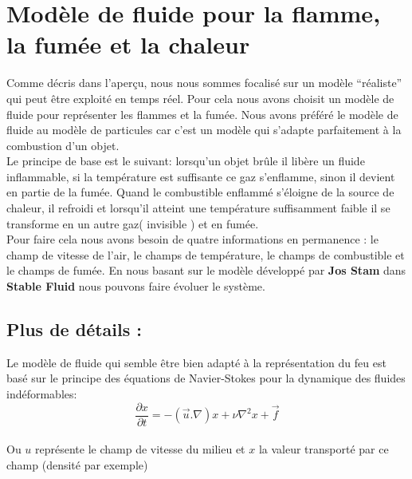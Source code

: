 \documentclass[a4paper,10pt]{article}
\begin{document}
\section{Modèle de fluide pour la flamme, la fumée et la chaleur}
Comme décris dans l'aperçu, nous nous sommes focalisé sur un modèle
``réaliste'' qui peut être exploité en temps réel. Pour cela nous
avons choisit un modèle de fluide pour représenter les flammes et la fumée. 
Nous avons préféré le modèle de fluide au modèle de particules
car c'est un modèle qui s'adapte parfaitement à la combustion d'un objet.\\

Le principe de base est le suivant: lorsqu'un objet brûle il libère un
fluide inflammable, si la température est suffisante ce gaz
s'enflamme, sinon il devient en partie de la fumée. Quand le
combustible enflammé s'éloigne de la source de chaleur, il refroidi et
lorsqu'il atteint une température suffisamment faible il se transforme
en un autre gaz( invisible ) et en fumée.\\

Pour faire cela nous avons besoin de quatre informations en permanence
: le champ de vitesse de l'air, le champs de température, le champs de combustible
 et le champs de fumée. En nous basant sur le modèle développé par \textbf{Jos Stam} 
 dans \textbf{Stable Fluid} nous pouvons faire évoluer le système.\\


\subsection{Plus de détails :}
Le modèle de fluide qui semble être bien adapté à la représentation du
feu est basé sur le principe des équations de Navier-Stokes pour la
dynamique des fluides indéformables:\\
\begin{equation}
   \frac{\partial x}{\partial t} = -(\vec{u}.\nabla)x + \nu{\nabla^2}x+ \vec{f} 
\end{equation}
\\
Ou $u$ représente le champ de vitesse du milieu et $x$ la valeur
transporté par ce champ (densité par exemple)\\
\end{document}
